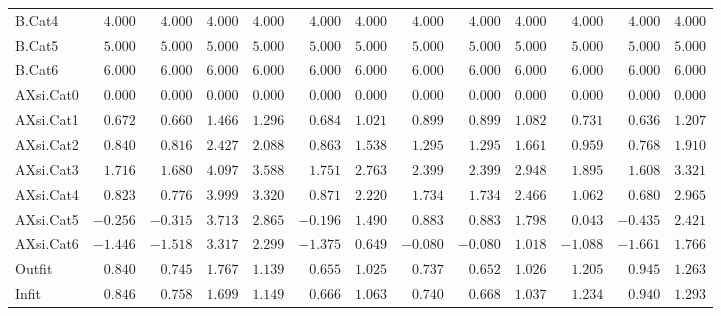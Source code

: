 \documentclass[6pt]{article}
\begin{document}
{\begin{longtable}{lrrrrrrrrrrrr}
B.Cat4&$ 4.000$&$ 4.000$&$ 4.000$&$ 4.000$&$ 4.000$&$ 4.000$&$ 4.000$&$ 4.000$&$ 4.000$&$ 4.000$&$ 4.000$&$ 4.000$\tabularnewline
B.Cat5&$ 5.000$&$ 5.000$&$ 5.000$&$ 5.000$&$ 5.000$&$ 5.000$&$ 5.000$&$ 5.000$&$ 5.000$&$ 5.000$&$ 5.000$&$ 5.000$\tabularnewline
B.Cat6&$ 6.000$&$ 6.000$&$ 6.000$&$ 6.000$&$ 6.000$&$ 6.000$&$ 6.000$&$ 6.000$&$ 6.000$&$ 6.000$&$ 6.000$&$ 6.000$\tabularnewline
AXsi.Cat0&$ 0.000$&$ 0.000$&$ 0.000$&$ 0.000$&$ 0.000$&$ 0.000$&$ 0.000$&$ 0.000$&$ 0.000$&$ 0.000$&$ 0.000$&$ 0.000$\tabularnewline
AXsi.Cat1&$ 0.672$&$ 0.660$&$ 1.466$&$ 1.296$&$ 0.684$&$ 1.021$&$ 0.899$&$ 0.899$&$ 1.082$&$ 0.731$&$ 0.636$&$ 1.207$\tabularnewline
AXsi.Cat2&$ 0.840$&$ 0.816$&$ 2.427$&$ 2.088$&$ 0.863$&$ 1.538$&$ 1.295$&$ 1.295$&$ 1.661$&$ 0.959$&$ 0.768$&$ 1.910$\tabularnewline
AXsi.Cat3&$ 1.716$&$ 1.680$&$ 4.097$&$ 3.588$&$ 1.751$&$ 2.763$&$ 2.399$&$ 2.399$&$ 2.948$&$ 1.895$&$ 1.608$&$ 3.321$\tabularnewline
AXsi.Cat4&$ 0.823$&$ 0.776$&$ 3.999$&$ 3.320$&$ 0.871$&$ 2.220$&$ 1.734$&$ 1.734$&$ 2.466$&$ 1.062$&$ 0.680$&$ 2.965$\tabularnewline
AXsi.Cat5&$-0.256$&$-0.315$&$ 3.713$&$ 2.865$&$-0.196$&$ 1.490$&$ 0.883$&$ 0.883$&$ 1.798$&$ 0.043$&$-0.435$&$ 2.421$\tabularnewline
AXsi.Cat6&$-1.446$&$-1.518$&$ 3.317$&$ 2.299$&$-1.375$&$ 0.649$&$-0.080$&$-0.080$&$ 1.018$&$-1.088$&$-1.661$&$ 1.766$\tabularnewline
Outfit&$ 0.840$&$ 0.745$&$ 1.767$&$ 1.139$&$ 0.655$&$ 1.025$&$ 0.737$&$ 0.652$&$ 1.026$&$ 1.205$&$ 0.945$&$ 1.263$\tabularnewline
Infit&$ 0.846$&$ 0.758$&$ 1.699$&$ 1.149$&$ 0.666$&$ 1.063$&$ 0.740$&$ 0.668$&$ 1.037$&$ 1.234$&$ 0.940$&$ 1.293$\tabularnewline
\hline
\end{longtable}}
\end{document}
